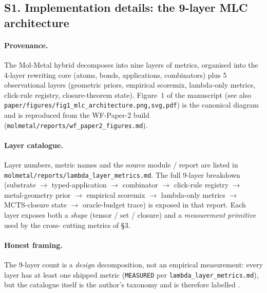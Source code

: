 
\subsection*{S1. Implementation details: the 9-layer MLC architecture}
\label{supp:s1-mlc-impl}

\paragraph{Provenance.}
The Mol-Metal hybrid decomposes into nine layers of metrics, organised
into the 4-layer rewriting core (atoms, bonds, applications,
combinators) plus 5 observational layers (geometric priors, empirical
scoremix, lambda-only metrics, click-rule registry, closure-theorem
state).  Figure~1 of the manuscript (see also
\texttt{paper/figures/fig1\_mlc\_architecture.{png,svg,pdf}}) is the
canonical diagram and is reproduced from the WF-Paper-2 build
(\texttt{molmetal/reports/wf\_paper2\_figures.md}).

\paragraph{Layer catalogue.}
Layer numbers, metric names and the source module / report are listed
in \texttt{molmetal/reports/lambda\_layer\_metrics.md}.  The full
9-layer breakdown (substrate $\rightarrow$ typed-application $\rightarrow$
combinator $\rightarrow$ click-rule registry $\rightarrow$ metal-geometry
prior $\rightarrow$ empirical scoremix $\rightarrow$ lambda-only metrics
$\rightarrow$ MCTS-closure state $\rightarrow$ oracle-budget trace) is
exposed in that report.  Each layer exposes both a \emph{shape} (tensor /
set / closure) and a \emph{measurement primitive} used by the cross-
cutting metrics of \S3.

\paragraph{Honest framing.}
The 9-layer count is a \emph{design} decomposition, not an empirical
measurement: every layer has at least one shipped metric
(\texttt{MEASURED} per \texttt{lambda\_layer\_metrics.md}), but the
catalogue itself is the author's taxonomy and is therefore labelled
\DESIGN{}.


